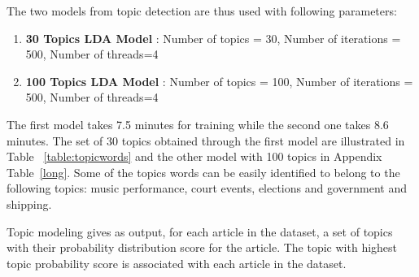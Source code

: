 The two models from topic detection are thus used with following parameters:
\begin{enumerate}
 \item \textbf{30 Topics LDA Model} : Number of topics = 30, Number of iterations = 500, Number of threads=4
 \item \textbf{100 Topics LDA Model} : Number of topics = 100, Number of iterations = 500, Number of threads=4
\end{enumerate}
The first model takes 7.5 minutes for training while the second one takes 8.6 minutes.
The set of 30 topics obtained through the first model are illustrated in Table ~\ref{table:topicwords} and the other model with 100 topics in Appendix Table~\ref{long}. Some of the topics words can be easily identified to belong to  the following topics: music performance, court events, elections and government and shipping.

Topic modeling gives as output, for each article in the dataset, a set of topics with their probability distribution score for the article. The topic with highest topic probability score is associated with each article in the dataset. 


